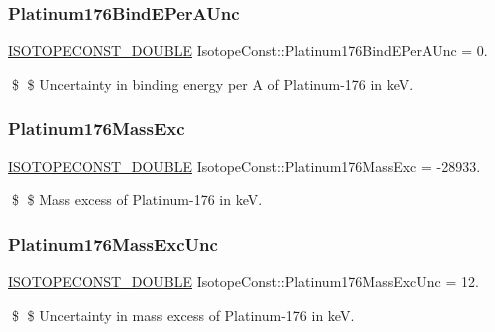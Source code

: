 \subsubsection{\texorpdfstring{Platinum176\+Bind\+E\+Per\+A\+Unc}{Platinum176BindEPerAUnc}}
{\footnotesize\ttfamily \mbox{\hyperlink{group___isotope_const-_macros_ga8f45a7272ce02c0b4c65c44636ed719a}{I\+S\+O\+T\+O\+P\+E\+C\+O\+N\+S\+T\+\_\+\+D\+O\+U\+B\+LE}} Isotope\+Const\+::\+Platinum176\+Bind\+E\+Per\+A\+Unc = 0.}

\$ \$ Uncertainty in binding energy per A of Platinum-\/176 in keV. \mbox{\label{group___isotope_const-_platinum-_pt176_gacd309cf77645488fc8ac207a32c02445}} 
\subsubsection{\texorpdfstring{Platinum176\+Mass\+Exc}{Platinum176MassExc}}
{\footnotesize\ttfamily \mbox{\hyperlink{group___isotope_const-_macros_ga8f45a7272ce02c0b4c65c44636ed719a}{I\+S\+O\+T\+O\+P\+E\+C\+O\+N\+S\+T\+\_\+\+D\+O\+U\+B\+LE}} Isotope\+Const\+::\+Platinum176\+Mass\+Exc = -\/28933.}

\$ \$ Mass excess of Platinum-\/176 in keV. \mbox{\label{group___isotope_const-_platinum-_pt176_ga7433f3e1b12aa1ae1a17b277effdbcfc}} 
\subsubsection{\texorpdfstring{Platinum176\+Mass\+Exc\+Unc}{Platinum176MassExcUnc}}
{\footnotesize\ttfamily \mbox{\hyperlink{group___isotope_const-_macros_ga8f45a7272ce02c0b4c65c44636ed719a}{I\+S\+O\+T\+O\+P\+E\+C\+O\+N\+S\+T\+\_\+\+D\+O\+U\+B\+LE}} Isotope\+Const\+::\+Platinum176\+Mass\+Exc\+Unc = 12.}

\$ \$ Uncertainty in mass excess of Platinum-\/176 in keV. \mbox{\label{group___isotope_const-_platinum-_pt176_ga928d443d3201396a97efe0538f1b6e8a}} 

